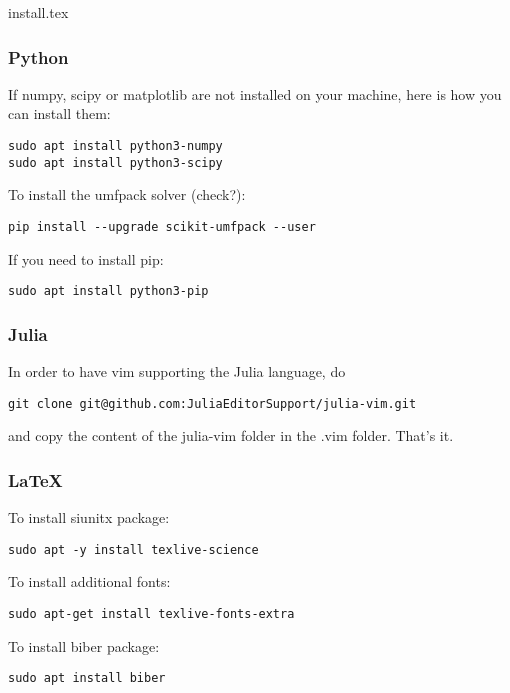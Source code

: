 \begin{flushright} {\tiny {\color{gray} install.tex}} \end{flushright}

\subsubsection{Python}

If numpy, scipy or matplotlib are not installed on your machine, here is how you 
can install them:
\begin{verbatim}
sudo apt install python3-numpy
sudo apt install python3-scipy
\end{verbatim}
To install the umfpack solver (check?):
\begin{verbatim}
pip install --upgrade scikit-umfpack --user
\end{verbatim}
If you need to install pip:
\begin{verbatim}
sudo apt install python3-pip
\end{verbatim}

\subsubsection{Julia}

In order to have vim supporting the Julia language, do 
\begin{verbatim}
git clone git@github.com:JuliaEditorSupport/julia-vim.git
\end{verbatim}
and copy the content of the julia-vim folder in the .vim folder.
That's it.

\subsubsection{LaTeX}

To install siunitx package:
\begin{verbatim}
sudo apt -y install texlive-science
\end{verbatim}
To install additional fonts:
\begin{verbatim}
sudo apt-get install texlive-fonts-extra 
\end{verbatim}
To install biber package:
\begin{verbatim}
sudo apt install biber 
\end{verbatim}





